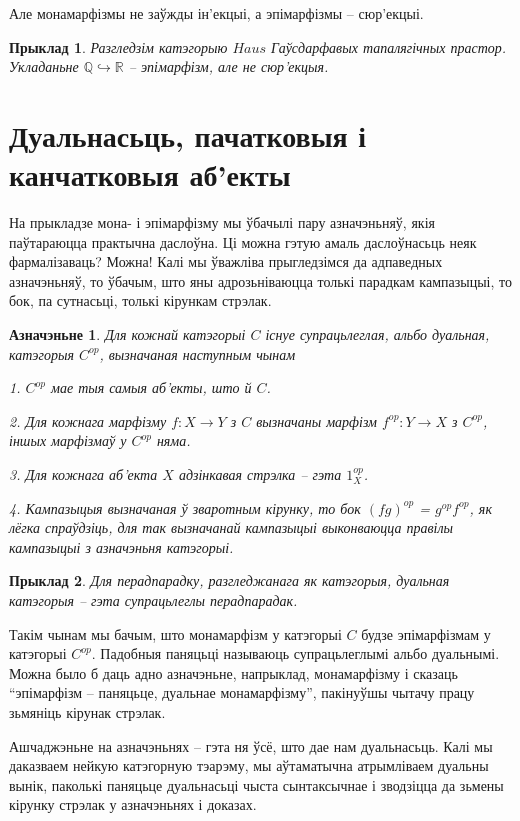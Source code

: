\documentclass[a4paper,12pt]{book}
\newtheorem{example}{Прыклад}[section]
\newtheorem{definition}{Азначэньне}[section]
\begin{document}
Але монамарфізмы не заўжды ін'екцыі, а эпімарфізмы -- сюр'екцыі.

\begin{example}
  Разгледзім катэгорыю $Haus$ Гаўсдарфавых тапалягічных
  прастор. Укладаньне $\mathbb{Q} \hookrightarrow \mathbb{R}$ --
  эпімарфізм, але не сюр'екцыя.
\end{example}

\section{Дуальнасьць, пачатковыя і канчатковыя аб'екты}

На прыкладзе мона- і эпімарфізму мы ўбачылі пару азначэньняў, якія
паўтараюцца практычна даслоўна. Ці можна гэтую амаль даслоўнасьць неяк
фармалізаваць? Можна! Калі мы ўважліва прыгледзімся да адпаведных
азначэньняў, то ўбачым, што яны адрозьніваюцца толькі парадкам
кампазыцыі, то бок, па сутнасьці, толькі кірункам стрэлак.

\begin{definition}
  Для кожнай катэгорыі $C$ існуе супрацьлеглая, альбо дуальная,
  катэгорыя $C^{op}$, вызначаная наступным чынам

  1. $C^{op}$ мае тыя самыя аб'екты, што й $C$.

  2. Для кожнага марфізму $f: X \rightarrow Y$ з $C$ вызначаны марфізм
  $f^{op}: Y \rightarrow X$ з $C^{op}$, іншых марфізмаў у $C^{op}$ няма.

  3. Для кожнага аб'екта $X$ адзінкавая стрэлка -- гэта $1_X^{op}$.

  4. Кампазыцыя вызначаная ў зваротным кірунку, то бок $(fg)^{op}$ =
  $g^{op}f^{op}$, як лёгка спраўдзіць, для так вызначанай кампазыцыі
  выконваюцца правілы кампазыцыі з азначэньня катэгорыі.
\end{definition}

\begin{example}
  Для перадпарадку, разгледжанага як катэгорыя, дуальная катэгорыя --
  гэта супрацьлеглы перадпарадак.
\end{example}

Такім чынам мы бачым, што монамарфізм у катэгорыі $C$ будзе
эпімарфізмам у катэгорыі $C^{op}$. Падобныя паняцьці называюць
супрацьлеглымі альбо дуальнымі. Можна было б даць адно азначэньне,
напрыклад, монамарфізму і сказаць ``эпімарфізм -- паняцьце, дуальнае
монамарфізму'', пакінуўшы чытачу працу зьмяніць кірунак стрэлак.

Ашчаджэньне на азначэньнях -- гэта ня ўсё, што дае нам
дуальнасьць. Калі мы даказваем нейкую катэгорную тэарэму, мы
аўтаматычна атрымліваем дуальны вынік, паколькі паняцьце дуальнасьці
чыста сынтаксычнае і зводзіцца да зьмены кірунку стрэлак у азначэньнях
і доказах.
\end{document}
